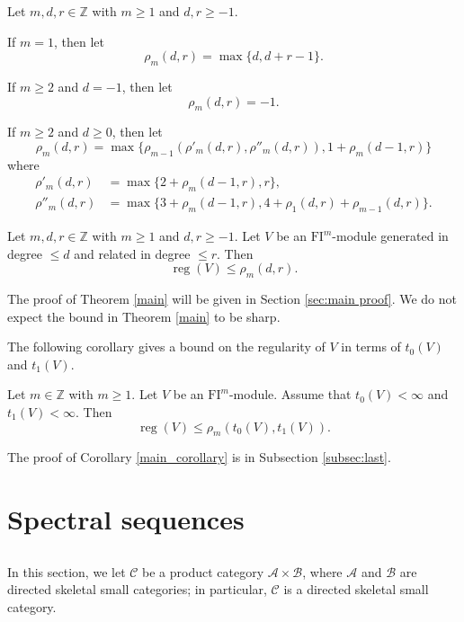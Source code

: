 \documentclass{amsart}
\numberwithin{equation}{section}
\DeclareMathOperator{\reg}{reg}
\newcommand{\C}{{\mathscr{C}}}
\newcommand{\A}{{\mathscr{A}}}
\newcommand{\B}{{\mathscr{B}}}
\newcommand{\FI}{{\mathrm{FI}}}
\begin{document}
\begin{definition} \label{def:rho}
   Let $m,d,r\in\mathbb{Z}$ with $m\geqslant 1$ and $d, r\geqslant -1$.

   If $m=1$, then let
   \[ \rho_m(d,r) = \max\{d, d+r-1\}. \]

   If $m\geqslant 2$ and $d=-1$, then let 
   \[ \rho_m(d,r) = -1. \]
   
   If $m\geqslant 2$ and $d\geqslant 0$, then let 
   \[ \rho_m(d,r) = \max\{ \rho_{m-1}(\rho'_m(d,r), \rho''_m(d,r)), 1+\rho_m(d-1,r) \} \]
   where 
   \begin{align*}
      \rho'_m(d,r) &= \max\{ 2+\rho_m(d-1, r), r \}  ,\\
      \rho''_m(d,r) &=  \max\{ 3+\rho_m(d-1, r), 4+ \rho_1(d,r) + \rho_{m-1}(d,r) \}.
   \end{align*}
\end{definition}


\begin{theorem} \label{main}
   Let $m, d, r\in \mathbb{Z}$ with $m\geqslant 1$ and $d, r\geqslant -1$. Let $V$ be an $\FI^m$-module generated in degree $\leqslant d$ and related in degree $\leqslant r$. Then
   \[ \reg(V) \leqslant \rho_m(d,r). \]  
\end{theorem}

The proof of Theorem \ref{main} will be given in Section \ref{sec:main proof}. We do not expect the bound in Theorem \ref{main} to be sharp. 


The following corollary gives a bound on the regularity of $V$ in terms of $t_0(V)$ and $t_1(V)$. 

\begin{corollary} \label{main_corollary}
   Let $m\in \mathbb{Z}$ with $m\geqslant 1$. Let $V$ be an $\FI^m$-module. Assume that $t_0(V)<\infty$ and $t_1(V)<\infty$. Then 
   \[ \reg(V) \leqslant \rho_m(t_0(V), t_1(V)). \]
\end{corollary}

The proof of Corollary \ref{main_corollary} is in Subsection \ref{subsec:last}.


\section{Spectral sequences} \label{sec:sp seq}

\subsection{}
In this section, we let $\C$ be a product category $\A\times \B$, where $\A$ and $\B$ are directed skeletal small categories; in particular, $\C$ is a directed skeletal small category. 
\end{document}
